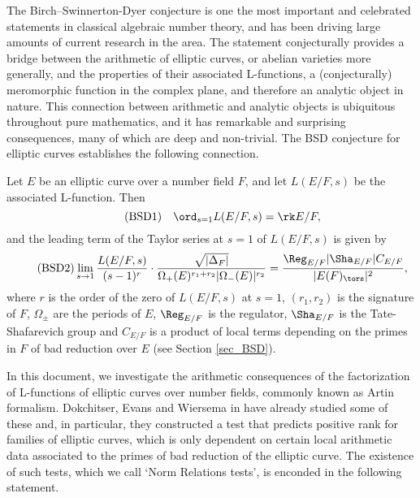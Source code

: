 The Birch--Swinnerton-Dyer conjecture is one the most important and celebrated statements in classical algebraic number theory, and has been driving large amounts of current research in the area. The statement conjecturally provides a bridge between the arithmetic of elliptic curves, or abelian varieties more generally, and the properties of their associated L-functions, a (conjecturally) meromorphic function in the complex plane, and therefore an analytic object in nature. This connection between arithmetic and analytic objects is ubiquitous throughout pure mathematics, and it has remarkable and surprising consequences, many of which are deep and non-trivial. The BSD conjecture for elliptic curves establishes the following connection.

\begin{conj}
    Let $E$ be an elliptic curve over a number field $F$, and let $L(E/F,s)$ be the associated L-function. Then
    \begin{equation}\label{eqn_BSD1}\tag{BSD1}
        \quad\ord_{s=1}L(E/F,s)=\rk E/F,
    \end{equation}
    and the leading term of the Taylor series at $s=1$ of $L(E/F,s)$ is given by
    \begin{equation}\label{eqn_BSD2}\tag{BSD2}
        \lim_{s\to1}\frac{L(E/F,s)}{(s-1)^r}\cdot\frac{\sqrt{|\Delta_F|}}{\Omega_+(E)^{r_1+r_2}|\Omega_-(E)|^{r_2}}=\frac{\Reg_{E/F}|\Sha_{E/F}|C_{E/F}}{|E(F)_{\tors}|^2},
    \end{equation}
    where $r$ is the order of the zero of $L(E/F,s)$ at $s=1$, $(r_1,r_2)$ is the signature of $F$, $\Omega_{\pm}$ are the periods of $E$, $\Reg_{E/F}$ is the regulator, $\Sha_{E/F}$ is the Tate-Shafarevich group and $C_{E/F}$ is a product of local terms depending on the primes in $F$ of bad reduction over $E$ (see Section \ref{sec_BSD}).
\end{conj}

In this document, we investigate the arithmetic consequences of the factorization of L-functions of elliptic curves over number fields, commonly known as Artin formalism. Dokchitser, Evans and Wiersema in \cite{DEW1} have already studied some of these and, in particular, they constructed a test that predicts positive rank for families of elliptic curves, which is only dependent on certain local arithmetic data associated to the primes of bad reduction of the elliptic curve. The existence of such tests, which we call `Norm Relations tests', is enconded in the following statement. 

